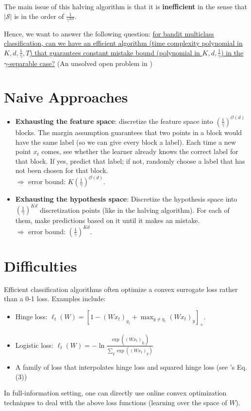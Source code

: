 \documentclass{article}
\newcommand{\calS}{{\mathcal{S}}}
\begin{document}
The main issue of this halving algorithm is that it is \textbf{inefficient} in the sense that $|\calS|$ is in the order of $\frac{1}{\gamma^{Kd}}$. 

Hence, we want to answer the following question: \ul{for bandit multiclass classification, can we have an efficient algorithm (time complexity polynomial in $K,d,\frac{1}{\gamma}, T$) that guarantees constant mistake bound (polynomial in $K,d,\frac{1}{\gamma}$) in the $\gamma$-separable case?} (An unsolved open problem in \cite{kakade2008efficient})

\section{Naive Approaches}
\begin{itemize}
    \item \textbf{Exhausting the feature space}: discretize the feature space into $ \left(\frac{1}{\gamma}\right)^{\mathcal{O}(d)} $ blocks. The margin assumption guarantees that two points in a block would have the same label (so we can give every block a label). Each time a new point $x_t$ comes, see whether the learner already knows the correct label for that block. If yes, predict that label; if not, randomly choose a label that has not been chosen for that block. \\
    $\Rightarrow $ error bound: $K\left(\frac{1}{\gamma}\right)^{\mathcal{O}(d)} $. 
    \item \textbf{Exhausting the hypothesis space}: Discretize the hypothesis space into $\left(\frac{1}{\gamma}\right)^{Kd}$ discretization points (like in the halving algorithm). For each of them, make predictions based on it until it makes an mistake. \\
    $\Rightarrow $ error bound: $\left(\frac{1}{\gamma}\right)^{Kd}$. 
\end{itemize}

\section{Difficulties}
\label{section: difficulty}
Efficient classification algorithms often optimize a convex surrogate loss rather than a 0-1 loss. Examples include: 
\begin{itemize}
    \item Hinge loss: $\ell_t(W) = [1-(Wx_t)_{y_t}+\max_{y\neq y_t}(Wx_t)_{y}]_+$. 
    \item Logistic loss: $\ell_t(W)=-\ln\frac{\exp((Wx_t)_{y_t})}{\sum_{y}\exp((Wx_t)_y)}$
    \item A family of loss that interpolates hinge loss and squared hinge loss (see \cite{beygelzimer2017efficient}'s Eq.(3))
\end{itemize}
In full-information setting, one can directly use online convex optimization techniques to deal with the above loss functions (learning over the space of $W$). 
\end{document}
